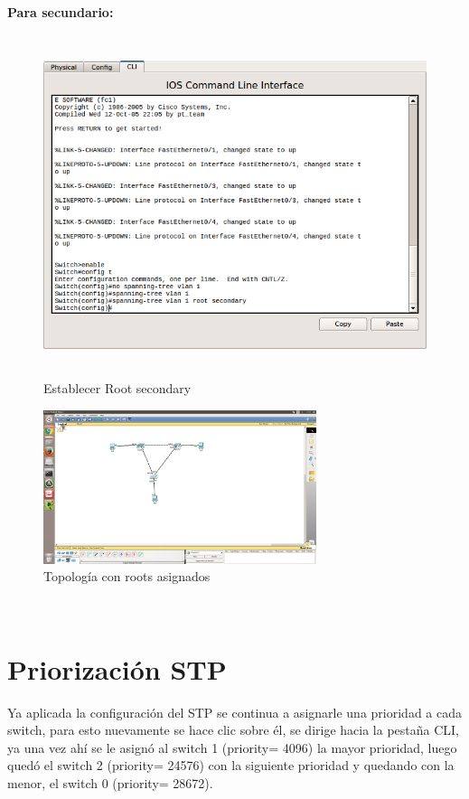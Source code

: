 \documentclass{udpreport}
\begin{document}
	{\large \bf{Para secundario: }}\\
	
    \begin{figure}[h]
    \centering
    \includegraphics[width=12cm, height=10cm]{4.png}
    \caption{Establecer Root secondary}
    \end{figure}
	
	
	\begin{figure}[h]
	\centering
	\includegraphics[width=8cm]{5.png}
	\caption{Topología con roots asignados}
	\end{figure}\\

	\section{Priorización STP}
	   
	    Ya aplicada la configuración del STP se continua a asignarle una prioridad a cada switch,  para esto nuevamente se hace clic	sobre él, se dirige hacia la pestaña CLI, ya una vez ahí se le asignó al switch 1 (priority= 4096) la mayor prioridad, luego quedó el switch 2 (priority= 24576) con la siguiente prioridad y quedando con la menor, el switch 0 (priority= 28672).\\\\\
	    
\end{document}

